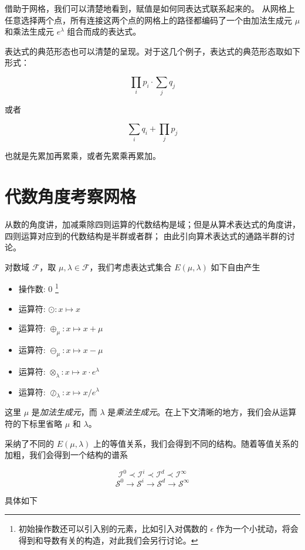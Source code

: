 \documentclass[a4paper,12pt]{article}
\numberwithin{definition}{section}
\numberwithin{lemma}{section}
\numberwithin{proposition}{section}
\numberwithin{theorem}{section}
\numberwithin{grammar}{section}
\numberwithin{program}{section}
\numberwithin{convention}{section}
\numberwithin{corollary}{section}
\begin{document}
借助于网格，我们可以清楚地看到，赋值是如何同表达式联系起来的。
从网格上任意选择两个点，所有连接这两个点的网格上的路径都编码了一个由加法生成元 $\mu$ 和乘法生成元 $e^\lambda$ 组合而成的表达式。

表达式的典范形态也可以清楚的呈现。对于这几个例子，表达式的典范形态取如下形式：

$$
\prod_{i} p_i \cdot \sum_{j} q_j
$$

或者

$$
\sum_{i} q_i + \prod_{j} p_j
$$

也就是先累加再累乘，或者先累乘再累加。

\newpage

\section{代数角度考察网格}

从数的角度讲，加减乘除四则运算的代数结构是域；但是从算术表达式的角度讲，四则运算对应到的代数结构是半群或者群；
由此引向算术表达式的通路半群的讨论。

对数域 $\mathcal{F}$，取 $\mu, \lambda \in \mathcal{F}$，我们考虑表达式集合 $E(\mu, \lambda)$ 如下自由产生
\begin{itemize}
    \item 操作数: $0$ \footnote[1]{初始操作数还可以引入别的元素，比如引入对偶数的 $\epsilon$ 作为一个小扰动，将会得到和导数有关的构造，对此我们会另行讨论。}
    \item 运算符: $\odot: x \mapsto x$
    \item 运算符: $\oplus_\mu: x \mapsto x + \mu$
    \item 运算符: $\ominus_\mu: x \mapsto x - \mu$
    \item 运算符: $\otimes_\lambda: x \mapsto x \cdot e^\lambda$
    \item 运算符: $\oslash_\lambda: x \mapsto x / e^\lambda$
\end{itemize}

这里 $\mu$ 是\emph{加法生成元}，而 $\lambda$ 是\emph{乘法生成元}。在上下文清晰的地方，我们会从运算符的下标里省略 $\mu$ 和 $\lambda$。

采纳了不同的 $E(\mu, \lambda)$ 上的等值关系，我们会得到不同的结构。随着等值关系的加粗，我们会得到一个结构的谱系

$$
  \mathcal{I}^0 \prec \mathcal{I}^i \prec \mathcal{I}^d \prec \mathcal{I}^\infty
$$
$$
  \mathcal{S}^0 \to \mathcal{S}^i \to \mathcal{S}^d \to \mathcal{S}^\infty
$$

具体如下
\end{document}

